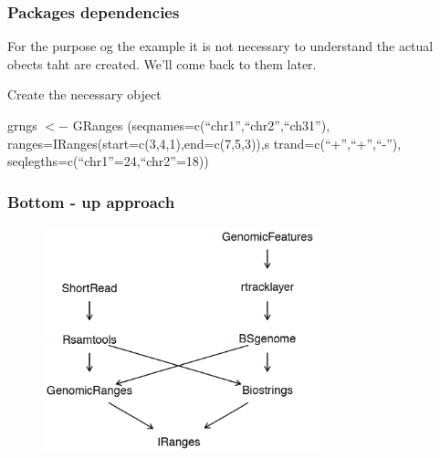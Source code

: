 \documentclass{beamer}
\begin{document}

\begin{frame}
\frametitle{Packages dependencies}
 \bit
    \item For the purpose og the example it is not necessary to 
    understand the actual obects taht are created. We'll come back to them later.
    \item Create the necessary object
      \bit
	  \item \small{grngs $<-$ GRanges (seqnames=c(``chr1'',``chr2'',``ch31''), 
	  ranges=IRanges(start=c(3,4,1),end=c(7,5,3)),s
	  trand=c(``+'',``+'',``\--''), seqlegths=c(``chr1''=24,``chr2''=18))}
      \eit
 \eit
\end{frame}


\begin{frame}
\frametitle{Bottom - up approach}
\begin{figure}[ht]
\centering
\includegraphics[width=80mm]{diagramas/Seleccio_001.png}
\end{figure}
\end{frame}

\end{document}
